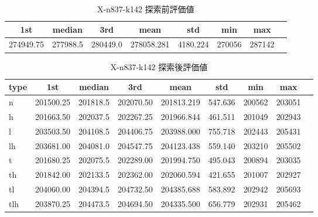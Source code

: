 \begin{table}[htbp]
    \centering
    \caption{X-n837-k142 探索前評価値}
    \begin{tabular}{|l|l|l|l|l|l|l|l|}\hline
    \multicolumn{1}{|c|}{\textbf{1st}}
    &\multicolumn{1}{c|}{\textbf{median}}
    &\multicolumn{1}{c|}{\textbf{3rd}}
    &\multicolumn{1}{c|}{\textbf{mean}}
    &\multicolumn{1}{c|}{\textbf{std}}
    &\multicolumn{1}{c|}{\textbf{min}}
    &\multicolumn{1}{c|}{\textbf{max}}\\\hline
	274949.75 & 277988.5 & 280449.0 & 278058.281 & 4180.224 & 270056 & 287142\\\hline
	\end{tabular}
\end{table}
\begin{table}[htbp]
    \centering
    \caption{X-n837-k142 探索後評価値}
    \begin{tabular}{|l|l|l|l|l|l|l|l|l|}\hline
    \multicolumn{1}{|c|}{\textbf{type}}
    &\multicolumn{1}{|c|}{\textbf{1st}}
    &\multicolumn{1}{c|}{\textbf{median}}
    &\multicolumn{1}{c|}{\textbf{3rd}}
    &\multicolumn{1}{c|}{\textbf{mean}}
    &\multicolumn{1}{c|}{\textbf{std}}
    &\multicolumn{1}{c|}{\textbf{min}}
    &\multicolumn{1}{c|}{\textbf{max}}\\\hline
	n & 201500.25 & 201818.5 & 202070.50 & 201813.219 & 547.636 & 200562 & 203051\\\hline
	h & 201663.50 & 202037.5 & 202267.25 & 201966.844 & 461.511 & 201049 & 202943\\\hline
	l & 203503.50 & 204108.5 & 204406.75 & 203988.000 & 755.718 & 202443 & 205431\\\hline
	lh & 203681.00 & 204081.0 & 204547.75 & 204123.438 & 559.140 & 203210 & 205502\\\hline
	t & 201680.25 & 202075.5 & 202289.00 & 201994.750 & 495.043 & 200894 & 203035\\\hline
	th & 201842.00 & 202133.5 & 202362.00 & 202060.594 & 421.655 & 201007 & 202927\\\hline
	tl & 204060.00 & 204394.5 & 204732.50 & 204385.688 & 583.892 & 202942 & 205693\\\hline
	tlh & 203870.25 & 204473.5 & 204694.50 & 204335.500 & 656.779 & 202931 & 205462\\\hline
	\end{tabular}
\end{table}
